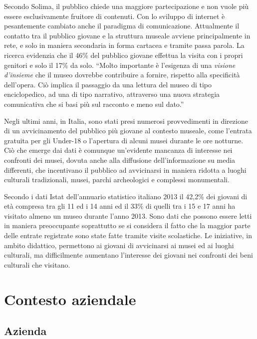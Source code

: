 Secondo Solima, il pubblico chiede una maggiore partecipazione e non vuole più essere esclusivamente fruitore di contenuti. Con lo sviluppo di internet è pesantemente cambiato anche il paradigma di comunicazione. Attualmente il contatto tra il pubblico giovane e la struttura museale avviene principalmente in rete, e solo in maniera secondaria in forma cartacea e tramite passa parola.
La ricerca evidenzia che il 46\% del pubblico giovane effettua la visita con i propri genitori e solo il 17\% da solo. “Molto importante è l'esigenza di una \textit{visione d'insieme} che il museo dovrebbe contribuire a fornire, rispetto alla specificità dell'opera. Ciò implica il passaggio da una lettura del museo di tipo enciclopedico, ad una di tipo narrativo, attraverso una nuova strategia comunicativa che si basi più sul racconto e meno sul dato.”

Negli ultimi anni, in Italia, sono stati presi numerosi provvedimenti in direzione di un avvicinamento del pubblico più giovane al contesto museale, come l’entrata gratuita per gli Under-18 o l’apertura di alcuni musei durante le ore notturne. Ciò che emerge dai dati è comunque un'evidente mancanza di interesse nei confronti dei musei, dovuta anche alla diffusione dell’informazione su media differenti, che incentivano il pubblico ad avvicinarsi in maniera ridotta a luoghi culturali tradizionali, musei, parchi archeologici e complessi monumentali.

Secondo i dati Istat dell'annuario statistico italiano 2013 \cite{DatiIstatMusei} il 42,2\% dei giovani di età compresa tra gli 11 ed i 14 anni ed il 33\% di quelli tra i 15 e 17 anni ha visitato almeno un museo durante l’anno 2013. Sono dati che possono essere letti in maniera preoccupante soprattutto se si considera il fatto che la maggior parte delle entrate registrate sono state fatte tramite visite scolastiche. Le iniziative, in ambito didattico, permettono ai giovani di avvicinarsi ai musei ed ai luoghi culturali, ma difficilmente aumentano l’interesse dei giovani nei confronti dei beni culturali che visitano.  

\section{Contesto aziendale}
\label{sec:contesto_aziendale}

\subsection{Azienda}
\label{sec:azienda}

